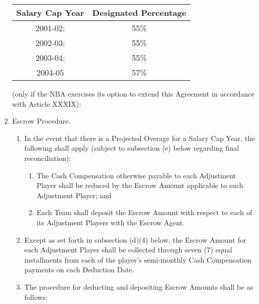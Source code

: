 \documentclass[
]{book}
\providecommand{\tightlist}{%
  \setlength{\itemsep}{0pt}\setlength{\parskip}{0pt}}
\begin{document}
\begin{enumerate}
  \begin{longtable}[]{@{}cc@{}}
  \toprule()
  Salary Cap Year & Designated Percentage \\
  \midrule()
  \endhead
  2001-02: & 55\% \\
  2002-03: & 55\% \\
  2003-04: & 55\% \\
  2004-05 & 57\% \\
  \bottomrule()
  \end{longtable}

  (only if the NBA exercises its option to extend this Agreement in accordance with Article XXXIX):
\item
  Escrow Procedure.

  \begin{enumerate}
  \def\labelenumii{(\arabic{enumii})}
  \tightlist
  \item
    In the event that there is a Projected Overage for a Salary Cap Year, the following shall apply (subject to subsection (e) below regarding final reconciliation):

    \begin{enumerate}
    \def\labelenumiii{(\roman{enumiii})}
    \tightlist
    \item
      The Cash Compensation otherwise payable to each Adjustment Player shall be reduced by the Escrow Amount applicable to such Adjustment Player; and
    \item
      Each Team shall deposit the Escrow Amount with respect to each of its Adjustment Players with the Escrow Agent.
    \end{enumerate}
  \item
    Except as set forth in subsection (d)(4) below, the Escrow Amount for each Adjustment Player shall be collected through seven (7) equal installments from each of the player's semi-monthly Cash Compensation payments on each Deduction Date.
  \item
    The procedure for deducting and depositing Escrow Amounts shall be as follows:


\end{enumerate}
\end{enumerate}
\end{document}
